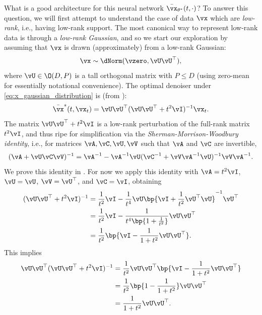 \documentclass[../../book-main.tex]{subfiles}
\begin{document}
What is a good architecture for this neural network \(\bar{\vx}_{\theta^{\ast}}(t, \cdot)\)? To answer this question, we will first attempt to understand the case of data \(\vx\) which are \textit{low-rank}, i.e., having low-rank support. The most canonical way to represent low-rank data is through a \textit{low-rank Gaussian}, and so we start our exploration by assuming that \(\vx\) is drawn (approximately) from a low-rank Gaussian:
\begin{equation}\label{eq:x_gaussian_distribution}
	\vx \sim \dNorm(\vzero, \vU\vU^{\top}),
\end{equation}
where \(\vU \in \O(D, P)\) is a tall orthogonal matrix with \(P \leq D\) (using zero-mean for essentially notational convenience).  The optimal denoiser under \eqref{eq:x_gaussian_distribution} is (from ):
\begin{equation}\label{eq:optimal denoiser}
	\bar{\vx}^{\ast}(t, \vx_{t}) = \vU\vU^{\top}(\vU\vU^{\top} + t^{2}\vI)^{-1}\vx_{t}.
\end{equation}
The matrix  \(\vU\vU^{\top} + t^{2}\vI\) is a low-rank perturbation of the full-rank matrix \(t^{2}\vI\), and thus ripe for simplification via the \textit{Sherman-Morrison-Woodbury identity}, i.e., for matrices \(\vA, \vC, \vU, \vV\) such that \(\vA\) and \(\vC\) are invertible,
\begin{equation}\label{eq:sherman_morrison_woodbury}
	(\vA + \vU\vC\vV)^{-1} = \vA^{-1} - \vA^{-1}\vU(\vC^{-1} + \vV\vA^{-1}\vU)^{-1}\vV\vA^{-1}.
\end{equation}
We prove this identity in . For now we apply this identity with \(\vA = t^{2}\vI\), \(\vU = \vU\), \(\vV = \vU^{\top}\), and \(\vC = \vI\), obtaining
\begin{align}
	(\vU\vU^{\top} + t^{2}\vI)^{-1} 
	&= \frac{1}{t^{2}}\vI - \frac{1}{t^{4}}\vU\bp{\vI + \frac{1}{t^{2}}\vU^{\top}\vU}^{-1}\vU^{\top} \\
	&= \frac{1}{t^{2}}\vI - \frac{1}{t^{4}\bp{1 + \frac{1}{t^{2}}}}\vU\vU^{\top} \\
	&= \frac{1}{t^{2}}\bp{\vI - \frac{1}{1 + t^{2}}\vU\vU^{\top}}.\label{eq:gaussian_lowrank_inverse_perturbation_simplified}
\end{align}
This implies
\begin{align}
	\vU\vU^{\top}(\vU\vU^{\top} + t^{2}\vI)^{-1}
	&= \frac{1}{t^{2}}\vU\vU^{\top}\bp{\vI - \frac{1}{1 + t^{2}}\vU\vU^{\top}} \\
	&= \frac{1}{t^{2}}\bp{1 - \frac{1}{1 + t^{2}}}\vU\vU^{\top} \\
	&= \frac{1}{1 + t^{2}}\vU\vU^{\top}.\label{eq:gaussian_lowrank_denoiser_simplified}
\end{align}
\end{document}

